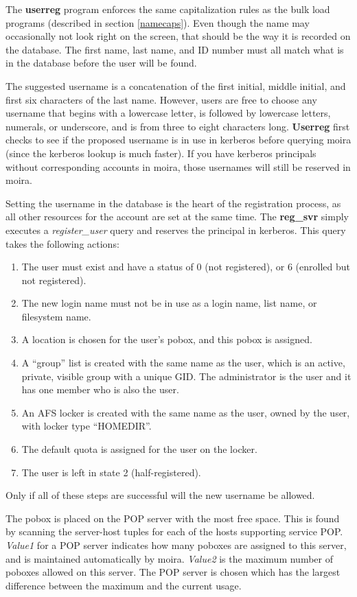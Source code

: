 The {\bf userreg} program enforces the same capitalization rules as
the bulk load programs (described in section \ref{namecaps}).  Even
though the name may occasionally not look right on the screen, that
should be the way it is recorded on the database.  The first name,
last name, and ID number must all match what is in the database before
the user will be found.

The suggested username is a concatenation of the first initial, middle
initial, and first six characters of the last name.  However, users
are free to choose any username that begins with a lowercase letter, is
followed by lowercase letters, numerals, or underscore, and is from
three to eight characters long.  {\bf Userreg} first checks to see if
the proposed username is in use in kerberos before querying moira
(since the kerberos lookup is much faster).  If you have kerberos
principals without corresponding accounts in moira, those usernames
will still be reserved in moira.

Setting the username in the database is the heart of the registration
process, as all other resources for the account are set at the same
time.  The {\bf reg\_svr} simply executes a {\em register\_user} query and
reserves the principal in kerberos.  This query takes the following
actions:
\begin{enumerate}
\item The user must exist and have a status of 0 (not registered), or 6
(enrolled but not registered).
\item The new login name must not be in use as a login name, list name, or
filesystem name.
\item A location is chosen for the user's pobox, and this pobox is assigned.
\item A ``group'' list is created with the same name as the user, which is
an active, private, visible group with a unique GID.  The
administrator is the user and it has one member who is also the user.
\item An AFS locker is created with the same name as the user, owned
by the user, with locker type ``HOMEDIR''.
\item The default quota is assigned for the user on the locker.
\item The user is left in state 2 (half-registered).
\end{enumerate}
Only if all of these steps are successful will the new username be
allowed.

The pobox is placed on the POP server with the most free space.  This
is found by scanning the server-host tuples for each of the hosts
supporting service POP.  {\em Value1} for a POP server indicates how
many poboxes are assigned to this server, and is maintained
automatically by moira.  {\em Value2} is the maximum number of poboxes
allowed on this server.  The POP server is chosen which has the
largest difference between the maximum and the current usage.

